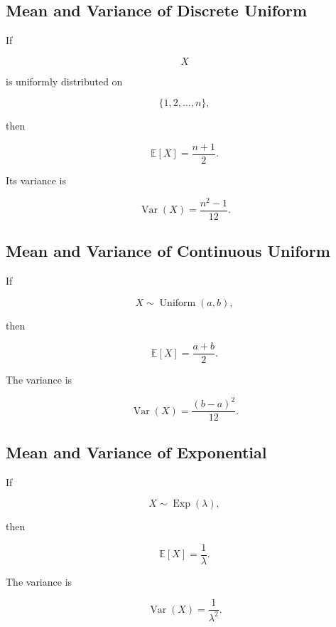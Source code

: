 \subsection{Mean and Variance of Discrete Uniform}
\label{subsec:discrete-uniform-mean-variance}

If

\[
X
\]

is uniformly distributed on

\[
\{1,2,\ldots,n\},
\]

then

\[
\boxed{
\mathbb{E}[X]
=
\frac{n+1}{2}.
}
\]

Its variance is

\[
\boxed{
\operatorname{Var}(X)
=
\frac{n^2-1}{12}.
}
\]

\subsection{Mean and Variance of Continuous Uniform}
\label{subsec:continuous-uniform-mean-variance}

If

\[
X\sim\operatorname{Uniform}(a,b),
\]

then

\[
\boxed{
\mathbb{E}[X]
=
\frac{a+b}{2}.
}
\]

The variance is

\[
\boxed{
\operatorname{Var}(X)
=
\frac{(b-a)^2}{12}.
}
\]

\subsection{Mean and Variance of Exponential}
\label{subsec:exponential-mean-variance}

If

\[
X\sim\operatorname{Exp}(\lambda),
\]

then

\[
\boxed{
\mathbb{E}[X]
=
\frac1\lambda.
}
\]

The variance is

\[
\boxed{
\operatorname{Var}(X)
=
\frac1{\lambda^2}.
}
\]

